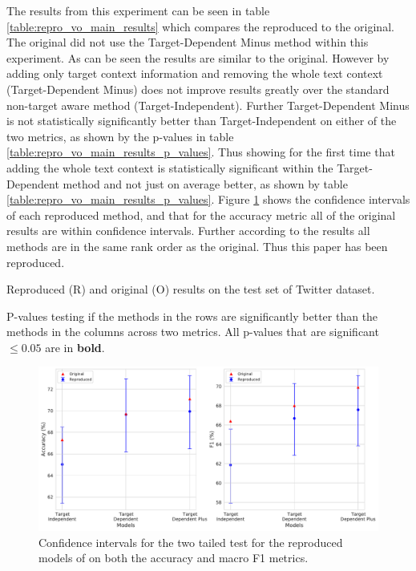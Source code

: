 The results from this experiment can be seen in table \ref{table:repro_vo_main_results} which compares the reproduced to the original. The original did not use the Target-Dependent Minus method within this experiment. As can be seen the results are similar to the original. However by adding only target context information and removing the whole text context (Target-Dependent Minus) does not improve results greatly over the standard non-target aware method (Target-Independent). Further Target-Dependent Minus is not statistically significantly better than Target-Independent on either of the two metrics, as shown by the p-values in table \ref{table:repro_vo_main_results_p_values}. Thus showing for the first time that adding the whole text context is statistically significant within the Target-Dependent method and not just on average better, as shown by table \ref{table:repro_vo_main_results_p_values}. Figure \ref{fig:repro_vo_Target_Reproduction_Dong} shows the confidence intervals of each reproduced method, and that for the accuracy metric all of the original results are within confidence intervals. Further according to the results all methods are in the same rank order as the original. Thus this paper has been reproduced.

\FloatBarrier
\begin{table}[!h]
    \centering
    
    \caption{Reproduced (R) and original (O) results on the test set of \citet{dong-etal-2014-adaptive} Twitter dataset.}
    \label{table:repro_vo_main_results}
\end{table}
\FloatBarrier

\FloatBarrier
\begin{table}[!h]
    \centering
    
    \caption{P-values testing if the methods in the rows are significantly better than the methods in the columns across two metrics. All p-values that are significant $\le 0.05$ are in \textbf{bold}.}
    \label{table:repro_vo_main_results_p_values}
\end{table}
\FloatBarrier

\begin{figure}[!h]
    \centering
    \includegraphics[scale=0.37]{images/reproducibility/vo/Target_Reproduction_Dong.pdf}
    \caption{Confidence intervals for the two tailed test for the reproduced models of \citet{vo2015target} on both the accuracy and macro F1 metrics.}
    \label{fig:repro_vo_Target_Reproduction_Dong}
\end{figure}

